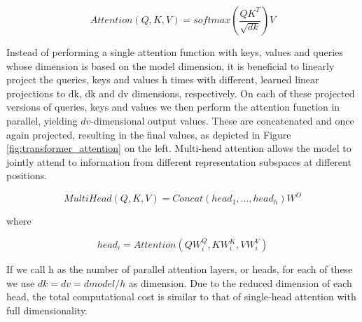 \begin{large}
$$Attention(Q, K, V ) = softmax(\frac{QK^T}{\sqrt{dk}})V$$
\end{large}
Instead of performing a single attention function with keys, values and queries whose dimension is based on the model dimension, it is beneficial to linearly project the queries, keys and values h times with different, learned linear projections to dk, dk and dv dimensions, respectively. On each of these projected versions of queries, keys and values we then perform the attention function in parallel, yielding $dv$-dimensional output values. These are concatenated and once again projected, resulting in the final values, as depicted in Figure \ref{fig:transformer_attention} on the left.
Multi-head attention allows the model to jointly attend to information from different representation subspaces at different positions.
\begin{large}
$$MultiHead(Q, K, V ) = Concat(head_{1}, ..., head_{h})W^O$$
\begin{center}where\end{center}
$$head_{i} = Attention(QW^Q_{i}, KW^K_{i}, VW^V_{i})$$
\end{large}
If we call h as the number of parallel attention layers, or heads, for each of these we use $dk=dv=dmodel/h$ as dimension. Due to the reduced dimension of each head, the total computational cost is similar to that of single-head attention with full dimensionality.
